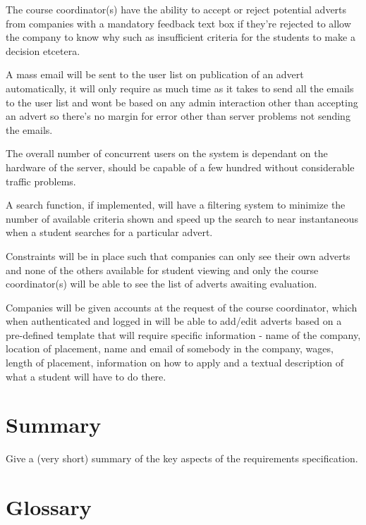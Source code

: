 \documentclass{l3deliverable}
\begin{document}
The course coordinator(s) have the ability to accept or reject potential adverts
from companies with a mandatory feedback text box if they're rejected to allow
the company to know why such as insufficient criteria for the students to make a
decision etcetera.

A mass email will be sent to the user list on publication of an advert
automatically, it will only require as much time as it takes to send all the
emails to the user list and wont be based on any admin interaction other than
accepting an advert so there's no margin for error other than server problems
not sending the emails.

The overall number of concurrent users on the system is dependant on the
hardware of the server, should be capable of a few hundred without considerable
traffic problems.

A search function, if implemented, will have a filtering system to minimize the
number of available criteria shown and speed up the search to near instantaneous
when a student searches for a particular advert.

Constraints will be in place such that companies can only see their own adverts
and none of the others available for student viewing and only the course
coordinator(s) will be able to see the list of adverts awaiting evaluation.

Companies will be given accounts at the request of the course coordinator, which
when authenticated and logged in will be able to add/edit adverts based on a
pre-defined template that will require specific information - name of the
company, location of placement, name and email of somebody in the company,
wages, length of placement, information on how to apply and a textual
description of what a student will have to do there.


\section{Summary}

Give a (very short) summary of the key aspects of the requirements
specification.


\appendix

\section{Glossary}
\end{document}
